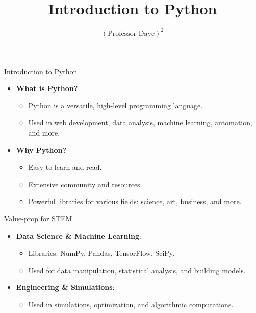 \documentclass[
  ignorenonframetext,
]{beamer}
\title{Introduction to Python}
\author{\((\text{Professor Dave})^2\)}
\date{}
\institute{The University of Austin}
\providecommand{\tightlist}{%
  \setlength{\itemsep}{0pt}\setlength{\parskip}{0pt}}
\begin{document}
\frame{\titlepage}

\begin{frame}{Introduction to Python}
\label{introduction-to-python}
\begin{itemize}
\tightlist
\item
  \textbf{What is Python?}

  \begin{itemize}
  \tightlist
  \item
    Python is a versatile, high-level programming language.
  \item
    Used in web development, data analysis, machine learning,
    automation, and more.
  \end{itemize}
\item
  \textbf{Why Python?}

  \begin{itemize}
  \tightlist
  \item
    Easy to learn and read.
  \item
    Extensive community and resources.
  \item
    Powerful libraries for various fields: science, art, business, and
    more.
  \end{itemize}
\end{itemize}
\end{frame}

\begin{frame}{Value-prop for STEM}
\label{value-prop-for-stem}
\begin{itemize}
\tightlist
\item
  \textbf{Data Science \& Machine Learning}:

  \begin{itemize}
  \tightlist
  \item
    Libraries: NumPy, Pandas, TensorFlow, SciPy.
  \item
    Used for data manipulation, statistical analysis, and building
    models.
  \end{itemize}
\item
  \textbf{Engineering \& Simulations}:

  \begin{itemize}
  \tightlist
  \item
    Used in simulations, optimization, and algorithmic computations.
  \end{itemize}
\end{itemize}
\end{frame}
\end{document}

